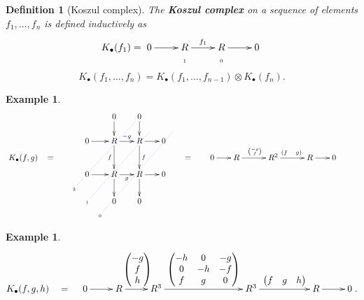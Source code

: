 \documentclass[11pt]{book}
\newtheorem{definition}[theorem]{Definition}
\numberwithin{equation}{section}
\numberwithin{theorem}{chapter}
\theoremstyle{definition}
\newtheorem{example}[theorem]{Example}
\newtheorem*{basic properties}{Basic Properties}
\newtheorem*{Important Remark}{Important Remark}
\theoremstyle{remark}
\begin{document}
\begin{definition}[Koszul complex]
	The {\bf Koszul complex} on a sequence of elements $f_1, \ldots, f_n$ is defined inductively as
	$$K_{\bullet}(f_1) = \xymatrix@R=0.5mm{0 \ar[r] & R \ar[r]^-{f_1} & R \ar[r] & 0 \\ & \textrm{\tiny{1}} & \textrm{\tiny{0}}}$$
	$$K_{\bullet} (f_1, \ldots, f_n) = K_{\bullet} (f_1, \ldots, f_{n-1}) \otimes K_{\bullet}(f_n).$$
\end{definition}


\begin{example}
	$$ 
	\xymatrix@R=2mm@C=2mm{
	&&&&&& 0 \ar[dd] && 0 \ar[dd] && \\ 
	&&&&&&&&&&&&&\\
	&&&& 0 \ar[rr] && R \ar[rr]^-{-g} \ar[dd]_-{f} && R \ar[rr] \ar[dd]^-{f} && 0 &&&&&&  \\ 
	K_{\bullet}(f,g) & = &&&&&&&&&&& = && 0 \ar[rr] && R \ar[rrr]^{{-g \choose f}} &&& R^2 \ar[rrr]^{(f \quad g)} &&& R \ar[rr] && 0 && \\
	&&&& 0 \ar[rr] && R \ar[rr]_-{g} \ar[dd] && R \ar[rr] \ar[dd] && 0 &&&&& \\ 
	&&& \textrm{\tiny{2}} \ar@{..}@[blue][uuuuurrrrr] &&&&&&& \\
	&&&& \textrm{\tiny{1}} \ar@{..}@[blue][uuuuurrrrr] && 0 && 0 &&&& \\
	&&&&& \textrm{\tiny{0}} \ar@{..}@[blue][uuuuururrrrr] &&&&&&
	 }  
	$$
	
	
\end{example}


\begin{example}
	$$K_\bullet(f,g,h) \quad = \quad \xymatrix{0 \ar[r] & R \ar[r]^{\begin{pmatrix} -g \\ f \\ h \end{pmatrix}} & R^3 \ar[rrr]^{\begin{pmatrix} -h & 0 & -g \\ 0 & -h & -f \\ f & g & 0 \end{pmatrix}} &&& R^3 \ar[rr]^-{\begin{pmatrix} f & g & h \end{pmatrix}} && R \ar[r] & 0}.$$
\end{example}
\end{document}
